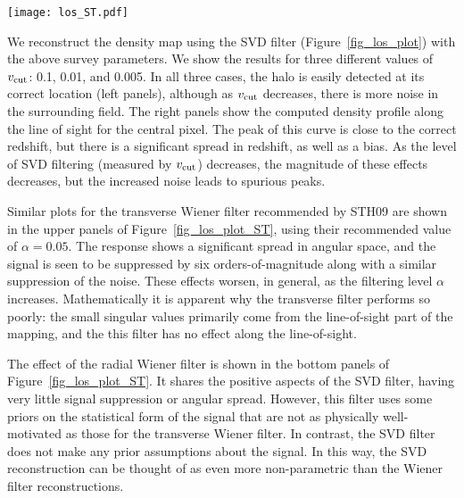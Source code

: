 \begin{figure*}[t]
 \centering
 \texttt{[image: los\_ST.pdf]}
 \caption{
   The effect of Wiener filtering on the same input as 
   Figure~\ref{fig_los_plot}. Here we have used both transverse 
   \textit{(top panels)}
   and radial \textit{(bottom panels)} Wiener filtering, both down-tuned 
   by $\alpha = 0.05$ (the value recommended by STH09).  
   The transverse Wiener filter suppresses the response by several 
   orders of magnitude; a closer view of the line-of-sight peak is shown 
   in the inset plot.  The radial Wiener filter gives similar angular 
   results to the SVD filter, but takes much longer to compute.
   \label{fig_los_plot_ST}} 
\end{figure*}

We reconstruct the density map using the SVD filter 
(Figure~\ref{fig_los_plot}) with the above survey parameters.  
We show the results for three different values of $v_{\rm cut}$: 
0.1, 0.01, and 0.005.  In all three cases, the halo is easily 
detected at its correct location (left panels),
although as $v_{\rm cut}$ decreases, there is more noise in the 
surrounding field.  The right panels show the computed density profile
along the line of sight for the central pixel. 
The peak of this curve is close to the correct redshift, 
but there is a significant spread in redshift, as well as a bias.
As the level of SVD filtering (measured by $v_{\rm cut}$) decreases, 
the magnitude of these effects decreases, but the increased noise 
leads to spurious peaks. 

Similar plots for the transverse Wiener filter recommended by STH09 are
shown in the upper panels of Figure~\ref{fig_los_plot_ST}, using their 
recommended value of $\alpha = 0.05$. 
The response shows a significant spread in angular space, and 
the signal is seen to be suppressed by six orders-of-magnitude along with
a similar suppression of the noise. 
These effects worsen, 
in general, as the filtering level $\alpha$ increases.
Mathematically it is apparent why the transverse filter performs so poorly:
the small singular values primarily come from the line-of-sight 
part of the mapping, and the this filter has no effect along the line-of-sight.

The effect of the radial Wiener filter is shown in the bottom panels of 
Figure~\ref{fig_los_plot_ST}.
It shares the positive aspects of the SVD filter, having very 
little signal suppression or angular spread.
However, this filter uses some priors on the statistical form of 
the signal that are not as physically well-motivated as those for the 
transverse Wiener filter.  In contrast, the SVD filter does not make 
any prior assumptions about the signal. In this way, the SVD reconstruction
can be thought of as even more non-parametric than the Wiener filter
reconstructions.

